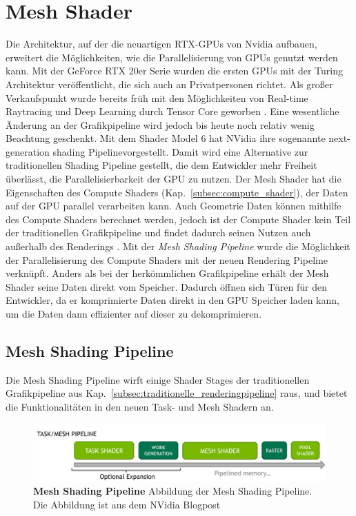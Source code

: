 \section{Mesh Shader}
Die Architektur, auf der die neuartigen RTX-GPUs von Nvidia aufbauen, erweitert die Möglichkeiten, wie die Parallelisierung von GPUs genutzt werden kann.
Mit der GeForce RTX 20er Serie wurden die ersten GPUs mit der Turing Architektur veröffentlicht, die sich auch an Privatpersonen richtet.
Als großer Verkaufspunkt wurde bereits früh mit den Möglichkeiten von Real-time Raytracing und Deep Learning durch Tensor Core geworben \cite{Burgess2020}. 
Eine wesentliche Änderung an der Grafikpipeline wird jedoch bis heute noch relativ wenig Beachtung geschenkt.
Mit dem Shader Model 6 hat NVidia ihre sogenannte \glqq next-generation shading Pipeline\grqq vorgestellt.
Damit wird eine Alternative zur traditionellen Shading Pipeline gestellt, die dem Entwickler mehr Freiheit überlässt, die Parallelisierbarkeit der GPU zu nutzen.
Der Mesh Shader hat die Eigenschaften des Compute Shaders (Kap.~\ref{subsec:compute_shader}), der Daten auf der GPU parallel verarbeiten kann.
Auch Geometrie Daten können mithilfe des Compute Shaders berechnet werden, jedoch ist der Compute Shader kein Teil der traditionellen Grafikpipeline und findet dadurch seinen Nutzen auch außerhalb des Renderings \cite{Ilett2022}.
Mit der \textit{Mesh Shading Pipeline} wurde die Möglichkeit der Parallelisierung des Compute Shaders mit der neuen Rendering Pipeline verknüpft.
Anders als bei der herkömmlichen Grafikpipeline erhält der Mesh Shader seine Daten direkt vom Speicher. 
Dadurch öffnen sich Türen für den Entwickler, da er komprimierte Daten direkt in den GPU Speicher laden kann, um die Daten dann effizienter auf dieser zu dekomprimieren.

\subsection{Mesh Shading Pipeline}
\label{subsec:meshshading_pipeline}
Die Mesh Shading Pipeline wirft einige Shader Stages der traditionellen Grafikpipeline aus Kap.~\ref{subsec:traditionelle_renderingpipeline} raus, und bietet die Funktionalitäten in den neuen Task- und Mesh Shadern an.
\begin{figure}[htb]
  \centering  
  \includegraphics[scale=0.43]{Bilder/Mesh_shading_pipeline.jpg}
  \caption[Mesh Shading Pipeline]{\textbf{Mesh Shading Pipeline} Abbildung der Mesh Shading Pipeline.
  Die Abbildung ist aus dem NVidia Blogpost \cite{Kubisch2018} }
  \label{fig:mesh_shading_pipeline}
\end{figure}

